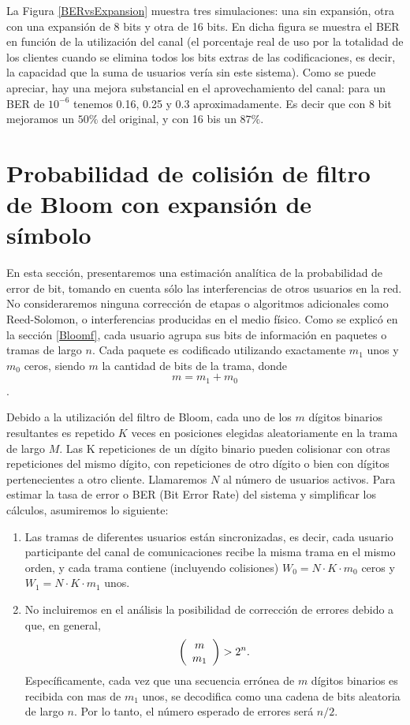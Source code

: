 La Figura \ref{BERvsExpansion} muestra tres simulaciones: una sin expansión, otra con una expansión de 8 bits y otra de 16 bits. En dicha figura se muestra el BER en función de la utilización del canal (el porcentaje real de uso por la totalidad de los clientes cuando se elimina todos los bits extras de las codificaciones, es decir, la capacidad que la suma de usuarios vería sin este sistema). Como se puede apreciar, hay una mejora substancial en el aprovechamiento del canal: para un BER de $10^{-6}$ tenemos 0.16, 0.25 y 0.3 aproximadamente. Es decir que con 8 bit mejoramos un $50\%$ del original, y con 16 bis un $87\%$.


\section{Probabilidad de colisión de filtro de Bloom con expansión de símbolo}

En esta sección, presentaremos una estimación analítica de la probabilidad de error de bit, tomando en cuenta sólo las interferencias de otros usuarios en la red.
No consideraremos ninguna corrección de etapas o algoritmos adicionales como Reed-Solomon, o interferencias producidas en el medio físico.
Como se explicó en la sección \ref{Bloomf}, cada usuario agrupa sus bits de información en paquetes o tramas de largo $n$. Cada paquete es codificado utilizando exactamente $m_{1}$ unos y $m_{0}$ ceros, siendo $m$ la cantidad de bits de la trama, donde $$m=m_{1}+m_{0}$$.

Debido a la utilización del filtro de Bloom, cada uno de los $m$ dígitos binarios resultantes es repetido $K$ veces en posiciones elegidas aleatoriamente en la trama de largo $M$. Las K repeticiones de un dígito binario pueden colisionar con otras repeticiones del mismo dígito, con repeticiones de otro dígito o bien con dígitos pertenecientes a otro cliente.
Llamaremos $N$ al número de usuarios activos. Para estimar la tasa de error o BER (Bit Error Rate) del sistema y simplificar los cálculos, asumiremos lo siguiente:

\begin{enumerate}
 \item Las tramas de diferentes usuarios están sincronizadas, es decir, cada usuario participante del canal de comunicaciones recibe la misma trama en el mismo orden, y cada trama contiene (incluyendo colisiones) $W_0 = N\cdot K\cdot m_0$ ceros y $W_1 = N\cdot K\cdot m_1$ unos.
 \item No incluiremos en el análisis la posibilidad de corrección de errores debido a que, en general, 
 \begin{equation}
\left(\begin{array}{c} m \\ m_1\end{array}\right) > 2^n.
\end{equation}
Específicamente, cada vez que una secuencia errónea de $m$ dígitos binarios es recibida con mas de $m_1$ unos, se decodifica como una cadena de bits aleatoria de largo $n$.
Por lo tanto, el número esperado de errores será $n/2$.
\end{enumerate}

